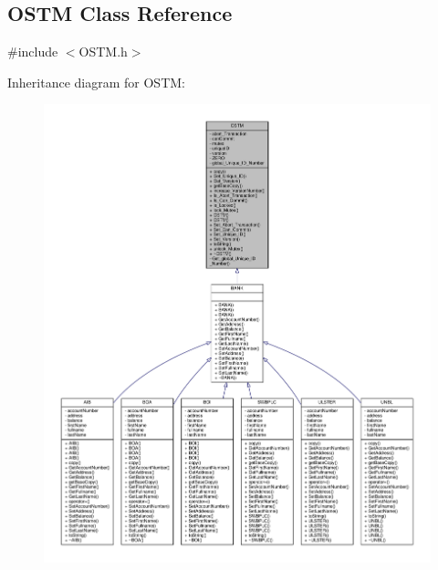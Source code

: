 \hypertarget{class_o_s_t_m}{}\subsection{O\+S\+TM Class Reference}
\label{class_o_s_t_m}


{\ttfamily \#include $<$O\+S\+T\+M.\+h$>$}



Inheritance diagram for O\+S\+TM\+:
\nopagebreak
\begin{figure}[H]
\begin{center}
\leavevmode
\includegraphics[width=350pt]{class_o_s_t_m__inherit__graph}
\end{center}
\end{figure}


